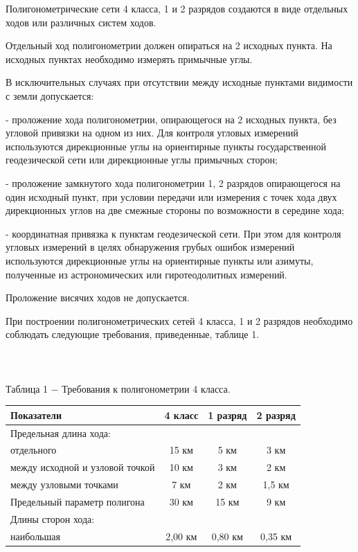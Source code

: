 \documentclass[a4paper]{article}
\begin{document}
\large{
\par Полигонометрические сети 4 класса, 1 и 2 разрядов создаются в виде отдельных ходов или различных систем ходов.
\par Отдельный ход полигонометрии должен опираться на 2 исходных пункта. На исходных пунктах необходимо измерять примычные углы.
\par В исключительных случаях при отсутствии между исходные пунктами видимости с земли допускается:
\par - проложение хода полигонометрии, опирающегося на 2 исходных пункта, без угловой привязки на одном из них. Для контроля угловых измерений используются дирекционные углы на ориентирные пункты государственной геодезической сети или дирекционные углы примычных сторон;
\par- проложение замкнутого хода полигонометрии 1, 2 разрядов опирающегося на один исходный пункт, при условии передачи или измерения с точек хода двух дирекционных углов на две смежные стороны по возможности в середине хода;
\par- координатная привязка к пунктам геодезической сети. При этом для контроля угловых измерений в целях обнаружения грубых ошибок измерений используются дирекционные углы на ориентирные пункты или азимуты, полученные из астрономических или гиротеодолитных измерений.
\par Проложение висячих ходов не допускается.
\par При построении полигонометрических сетей 4 класса, 1 и 2 разрядов необходимо соблюдать следующие требования, приведенные, таблице 1.\\
\\
\\
\\
Таблица 1 $-$ Требования к полигонометрии 4 класса.\\
\begin{tabular}{|l|c|c|c|}
\hline
Показатели & 4 класс & 1 разряд & 2 разряд \\
\hline
Предельная длина хода: & & & \\
отдельного & 15 км & 5 км & 3 км \\
между исходной и узловой точкой & 10 км & 3 км & 2 км\\
между узловыми точками& 7 км & 2 км & 1,5 км \\
\hline
Предельный параметр полигона & 30 км & 15 км & 9 км \\
\hline
Длины сторон хода: & & & \\
наибольшая & 2,00 км & 0,80 км & 0,35 км \\

\end{tabular}}
\end{document}
